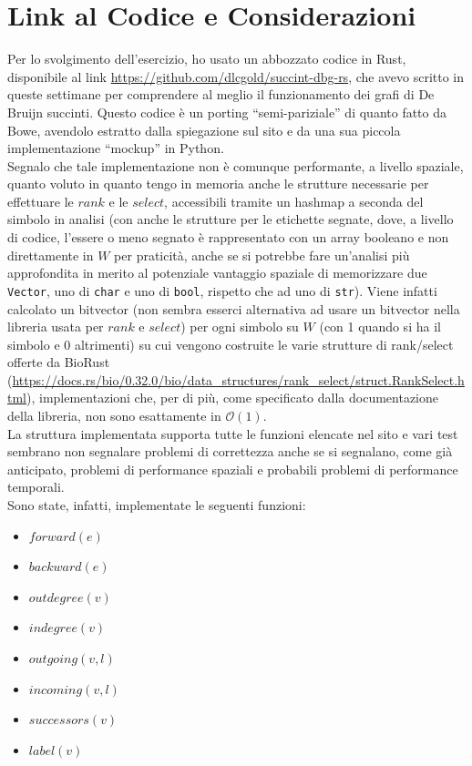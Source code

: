 \documentclass[a4paper,12pt, oneside]{book}
\begin{document}
\section{Link al Codice e Considerazioni}
Per lo svolgimento dell'esercizio, ho usato un abbozzato codice in Rust,
disponibile al link \url{https://github.com/dlcgold/succint-dbg-rs}, che avevo
scritto in queste settimane per comprendere al meglio il funzionamento dei grafi
di De Bruijn succinti. Questo codice è un porting ``semi-pariziale'' di quanto
fatto da Bowe, avendolo estratto dalla spiegazione sul sito e da una sua piccola
implementazione ``mockup'' in Python.\\
Segnalo che tale implementazione non è comunque performante, a livello spaziale,
quanto voluto in quanto tengo in memoria anche le strutture necessarie per
effettuare le $rank$ e le $select$, accessibili tramite un hashmap a seconda del
simbolo in analisi (con anche le strutture per le etichette segnate, dove, a
livello di codice, l'essere o meno segnato è rappresentato con un array booleano
e non direttamente in $W$ per praticità, anche se si potrebbe fare un'analisi
più approfondita in merito al potenziale vantaggio spaziale di memorizzare due
\texttt{Vector}, uno di \texttt{char} e uno di \texttt{bool}, rispetto che ad
uno di \texttt{str}). Viene infatti calcolato un bitvector (non sembra esserci 
alternativa ad usare un bitvector nella libreria usata per $rank$ e $select$)
per ogni simbolo su $W$ (con 1 quando si ha il simbolo e 0 altrimenti) su cui
vengono costruite le varie strutture di rank/select offerte da BioRust
(\url{https://docs.rs/bio/0.32.0/bio/data_structures/rank_select/struct.RankSelect.html}),
implementazioni che, per di più, come specificato dalla documentazione
della libreria, non sono esattamente in $\mathcal{O}(1)$.\\
La struttura implementata supporta tutte le funzioni elencate nel sito e vari
test sembrano non 
segnalare problemi di correttezza anche se si segnalano, come già anticipato,
problemi di performance spaziali e probabili problemi di performance
temporali.\\
Sono state, infatti, implementate le seguenti funzioni:
\begin{itemize}
  \item $forward(e)$
  \item $backward(e)$
  \item $outdegree(v)$
  \item $indegree(v)$
  \item $outgoing(v,l)$
  \item $incoming(v, l)$
  \item $successors(v)$
  \item $label(v)$
\end{itemize}
\end{document}

